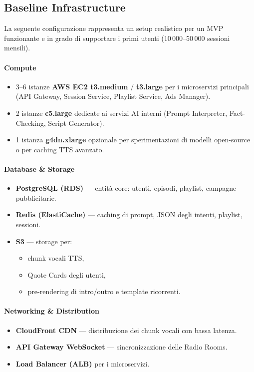 \documentclass[11pt,a4paper]{article}
\begin{document}

\subsection{Baseline Infrastructure}

La seguente configurazione rappresenta un setup realistico per un MVP funzionante e in grado di supportare i primi utenti (10\,000--50\,000 sessioni mensili).

\paragraph{Compute}
\begin{itemize}
    \item 3--6 istanze \textbf{AWS EC2 t3.medium} / \textbf{t3.large} per i microservizi principali (API Gateway, Session Service, Playlist Service, Ads Manager).
    \item 2 istanze \textbf{c5.large} dedicate ai servizi AI interni (Prompt Interpreter, Fact-Checking, Script Generator).
    \item 1 istanza \textbf{g4dn.xlarge} opzionale per sperimentazioni di modelli open-source o per caching TTS avanzato.
\end{itemize}

\paragraph{Database \& Storage}
\begin{itemize}
    \item \textbf{PostgreSQL (RDS)} — entità core: utenti, episodi, playlist, campagne pubblicitarie.
    \item \textbf{Redis (ElastiCache)} — caching di prompt, JSON degli intenti, playlist, sessioni.
    \item \textbf{S3} — storage per:
        \begin{itemize}
            \item chunk vocali TTS,
            \item Quote Cards degli utenti,
            \item pre-rendering di intro/outro e template ricorrenti.
        \end{itemize}
\end{itemize}

\paragraph{Networking \& Distribution}
\begin{itemize}
    \item \textbf{CloudFront CDN} — distribuzione dei chunk vocali con bassa latenza.
    \item \textbf{API Gateway WebSocket} — sincronizzazione delle Radio Rooms.
    \item \textbf{Load Balancer (ALB)} per i microservizi.
\end{itemize}
\end{document}

